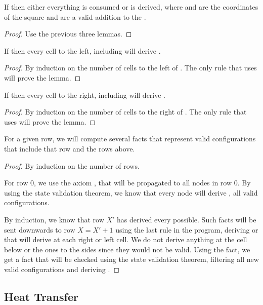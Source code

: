 \begin{theorem}
If  then either everything is consumed or  is derived, where  and  are the coordinates of the square and are a valid addition to the .
\end{theorem}
\begin{proof}
Use the previous three lemmas.
\end{proof}

\begin{lemma}
If  then every cell to the left, including  will derive .
\end{lemma}
\begin{proof}
By induction on the number of cells to the left of . The only rule that uses  will prove the lemma.
\end{proof}

\begin{lemma}
If  then every cell to the right, including  will derive .
\end{lemma}
\begin{proof}
By induction on the number of cells to the right of . The only rule that uses  will prove the lemma.
\end{proof}

\begin{theorem}
For a given row, we will compute several  facts that represent valid configurations that include that row and the rows above.
\end{theorem}
\begin{proof}
By induction on the number of rows.

For row 0, we use the axiom , that will be propagated to all nodes in row 0. By using the state validation theorem, we know that every node will derive , all valid configurations.


By induction, we know that row $X'$ has derived every  possible. Such facts will be sent downwards to row $X = X' + 1$ using the last rule in the program, deriving  or  that will derive  at each right or left cell. We do not derive anything at the cell below or the ones to the sides since they would not be valid. Using the  fact, we get a  fact that will be checked using the state validation theorem, filtering all new valid configurations and deriving .
\end{proof}

\subsection{Heat Transfer}


